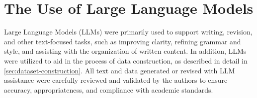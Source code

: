 \section{The Use of Large Language Models}
Large Language Models (LLMs) were primarily used to support writing, revision, and other text-focused tasks, such as improving clarity, refining grammar and style, and assisting with the organization of written content.
In addition, LLMs were utilized to aid in the process of data construction, as described in detail in \cref{sec:dataset-construction}.
All text and data generated or revised with LLM assistance were carefully reviewed and validated by the authors to ensure accuracy, appropriateness, and compliance with academic standards.
